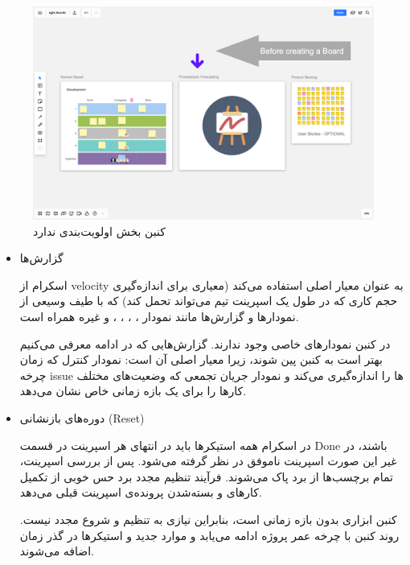 {\begin{figure}
	\centering
	\includegraphics[scale=0.3]{figs/4-2-d}
	\caption{کنبن بخش اولویت‌بندی ندارد}
\end{figure}

\begin{itemize}

\item گزارش‌ها

اسکرام از velocity به عنوان معیار اصلی استفاده می‌کند (معیاری برای اندازه‌گیری حجم کاری که در طول یک اسپرینت تیم می‌تواند تحمل کند) که با طیف وسیعی از نمودارها و گزارش‌ها مانند
نمودار ، ، ، ،  و غیره همراه است.

در کنبن نمودارهای خاصی وجود ندارند. گزارش‌هایی که در ادامه معرفی می‌کنیم بهتر است به کنبن پین شوند، زیرا معیار اصلی آن  است: نمودار کنترل که زمان چرخه  issue ها را اندازه‌گیری می‌کند و نمودار جریان تجمعی که وضعیت‌های مختلف کارها را برای یک بازه زمانی خاص نشان می‌دهد.

\item دوره‌های بازنشانی (Reset)

در اسکرام همه استیکرها باید در انتهای هر اسپرینت در قسمت Done باشند، در غیر این صورت اسپرینت ناموفق در نظر گرفته می‌شود. پس از بررسی اسپرینت، تمام برچسب‌ها از برد پاک می‌شوند. فرآیند تنظیم مجدد برد حس خوبی از تکمیل کارهای و بسته‌شدن پرونده‌ی اسپرینت قبلی می‌دهد.

کنبن ابزاری بدون بازه زمانی است، بنابراین نیازی به تنظیم و شروع مجدد نیست. روند کنبن با چرخه عمر پروژه ادامه می‌یابد و موارد جدید و استیکرها در گذر زمان اضافه می‌شوند.

\end{itemize}

}

